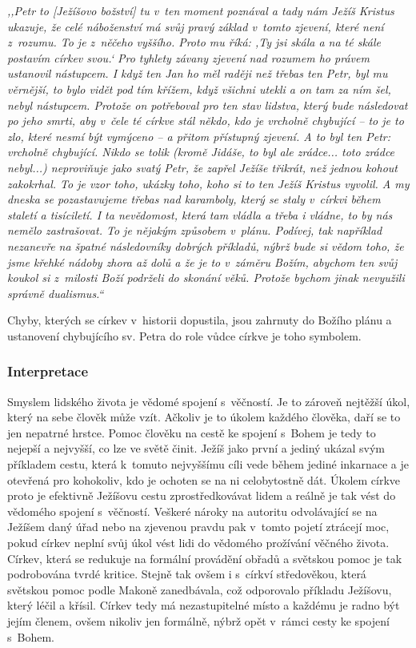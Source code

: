 \begin{enumerate}
{%
\textit{%
,,Petr to [Ježíšovo božství] tu v~ten moment poznával a tady nám Ježíš Kristus ukazuje, že celé
náboženství má svůj pravý základ v~tomto zjevení, které není z~rozumu. To je
z~něčeho vyššího. Proto mu říká: ,Ty jsi skála a na té skále postavím církev
svou.` Pro tyhlety závany zjevení nad rozumem ho právem ustanovil nástupcem. I
když ten Jan ho měl raději než třebas ten Petr, byl mu věrnější, to bylo vidět
pod tím křížem, když všichni utekli a on tam za ním šel, nebyl nástupcem.
Protože on potřeboval pro ten stav lidstva, který bude následovat po jeho smrti,
aby v~čele té církve stál někdo, kdo je vrcholně chybující -- to je to zlo, které
nesmí být vymýceno -- a přitom přístupný zjevení. A to byl ten Petr: vrcholně
chybující. Nikdo se tolik (kromě Jidáše, to byl ale zrádce... toto zrádce
nebyl...) neproviňuje jako svatý Petr, že zapřel Ježíše třikrát, než jednou
kohout zakokrhal. To je vzor toho, ukázky toho, koho si to ten Ježíš Kristus
vyvolil. A my dneska se pozastavujeme třebas nad karamboly, který se staly
v~církvi během staletí a tisíciletí. I ta nevědomost, která tam vládla a třeba i
vládne, to by nás nemělo zastrašovat. To je nějakým způsobem v~plánu. Podívej,
tak například nezanevře na špatné následovníky dobrých příkladů, nýbrž bude si
vědom toho, že jsme křehké nádoby zhora až dolů a že je to v~záměru Božím,
abychom ten svůj koukol si z~milosti Boží podrželi do skonání věků. Protože
bychom jinak nevyužili správně dualismus.``
}

Chyby, kterých se církev v~historii dopustila, jsou zahrnuty do Božího plánu a
ustanovení chybujícího sv. Petra do role vůdce církve je toho symbolem.

}

\end{enumerate}

\subsubsection*{Interpretace}

Smyslem lidského života je vědomé spojení s~věčností. Je to zároveň nejtěžší
úkol, který na sebe člověk může vzít. Ačkoliv je to úkolem každého člověka, daří
se to jen nepatrné hrstce. Pomoc člověku na cestě ke spojení s~Bohem je tedy to
nejepší a nejvyšší, co lze ve světě činit. Ježíš jako první a jediný ukázal svým
příkladem cestu, která k~tomuto nejvyššímu cíli vede během jediné inkarnace a je
otevřená pro kohokoliv, kdo je ochoten se na ni celobytostně dát. Úkolem církve
proto je efektivně Ježíšovu cestu zprostředkovávat lidem a reálně je tak vést do
vědomého spojení s~věčností. Veškeré nároky na autoritu odvolávající se na
Ježíšem daný úřad nebo na zjevenou pravdu pak v~tomto pojetí ztrácejí moc, pokud
církev neplní svůj úkol vést lidi do vědomého prožívání věčného života. Církev,
která se redukuje na formální provádění obřadů a světskou pomoc je tak
podrobována tvrdé kritice. Stejně tak ovšem i s~církví středověkou, která
světskou pomoc podle Makoně zanedbávala, což odporovalo příkladu Ježíšovu, který
léčil a křísil. Církev tedy má nezastupitelné místo a každému je radno být jejím
členem, ovšem nikoliv jen formálně, nýbrž opět v~rámci cesty ke spojení s~Bohem.

